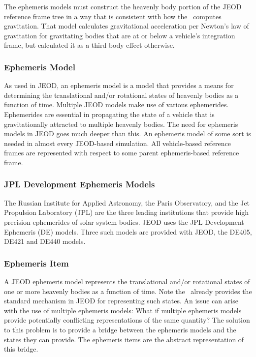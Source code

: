 The ephemeris models must construct the heavenly body portion of the
JEOD reference frame tree in a way that is consistent with how the
\GRAVITY\ computes gravitation. That model calculates gravitational acceleration
per Newton's law of gravitation for gravitating bodies that are at or below a
vehicle's integration frame, but calculated it as a third body effect otherwise.

\subsubsection{Ephemeris Model}
As used in JEOD, an ephemeris model is a model that provides
a means for determining the translational and/or rotational
states of heavenly bodies as a function of time. Multiple JEOD models
make use of various ephemerides. Ephemerides are essential
in propagating the state of a vehicle that is gravitationally attracted
to multiple heavenly bodies. The need for ephemeris models in JEOD
goes much deeper than this. An ephemeris model of some sort is needed
in almost every JEOD-based simulation. All vehicle-based reference frames
are represented with respect to some parent ephemeris-based
reference frame.

\subsubsection{JPL Development Ephemeris Models}
The Russian Institute for Applied Astronomy, the Paris Observatory,
and the Jet Propulsion Laboratory (JPL) are the three leading institutions
that provide high precision ephemerides of solar system bodies.
JEOD uses the JPL Development Ephemeris (DE) models. Three such models are
provided with JEOD, the DE405, DE421 and DE440 models.

\subsubsection{Ephemeris Item}
A JEOD ephemeris model represents the translational and/or rotational
states of one or more heavenly bodies as a function of time.
Note the \REFFRAMES\ already provides the standard mechanism in JEOD
for representing such states.
An issue can arise with the use of multiple ephemeris models:
What if multiple ephemeris models provide potentially conflicting
representations of the same quantity?
The solution to this problem is to provide a bridge between the
ephemeris models and the states they can provide.
The ephemeris items are the abstract representation of this bridge.

